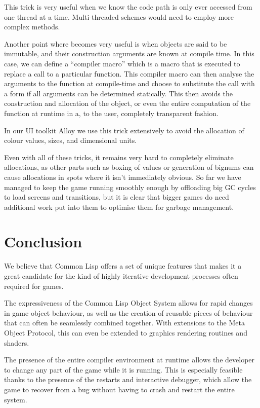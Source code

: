 \documentclass[a4paper]{paper}
\begin{document}
This trick is very useful when we know the code path is only ever accessed from one thread at a time. Multi-threaded schemes would need to employ more complex methods.

Another point where  becomes very useful is when objects are said to be immutable, and their construction arguments are known at compile time. In this case, we can define a ``compiler macro'' which is a macro that is executed to replace a call to a particular function. This compiler macro can then analyse the arguments to the function at compile-time and choose to substitute the call with a  form if all arguments can be determined statically. This then avoids the construction and allocation of the object, or even the entire computation of the function at runtime in a, to the user, completely transparent fashion.

In our UI toolkit Alloy we use this trick extensively to avoid the allocation of colour values, sizes, and dimensional units.

Even with all of these tricks, it remains very hard to completely eliminate allocations, as other parts such as boxing of values or generation of bignums can cause allocations in spots where it isn't immediately obvious. So far we have managed to keep the game running smoothly enough by offloading big GC cycles to load screens and transitions, but it is clear that bigger games do need additional work put into them to optimise them for garbage management.

\section{Conclusion}
We believe that Common Lisp offers a set of unique features that makes it a great candidate for the kind of highly iterative development processes often required for games.

The expressiveness of the Common Lisp Object System allows for rapid changes in game object behaviour, as well as the creation of reusable pieces of behaviour that can often be seamlessly combined together. With extensions to the Meta Object Protocol, this can even be extended to graphics rendering routines and shaders.

The presence of the entire compiler environment at runtime allows the developer to change any part of the game while it is running. This is especially feasible thanks to the presence of the restarts and interactive debugger, which allow the game to recover from a bug without having to crash and restart the entire system.
\end{document}
